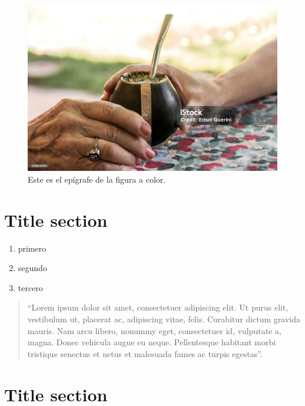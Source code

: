 \documentclass{book}
\begin{document}
\lipsum[1]

\begin{figure}[!ht]
	\centering
	\includegraphics[width=\textwidth]{imagen1.jpg}
	\caption{Este es el epígrafe de la figura a color.}\label{figura1}
\end{figure}

\section{Title section}

\begin{enumerate}
	\item primero
	\item segundo
	\item tercero
\end{enumerate}

\lipsum[3]

\begin{quote}
	\enquote{Lorem ipsum dolor sit amet, consectetuer adipiscing elit. Ut purus elit, vestibulum ut, placerat ac, adipiscing vitae, felis. Curabitur dictum gravida mauris. Nam arcu libero, nonummy eget, consectetuer id, vulputate a, magna. Donec vehicula augue eu neque. Pellentesque habitant morbi tristique senectus et netus et malesuada fames ac turpis egestas}.
\end{quote}

\lipsum[5]

\section{Title section}

\lipsum[1]
\end{document}
